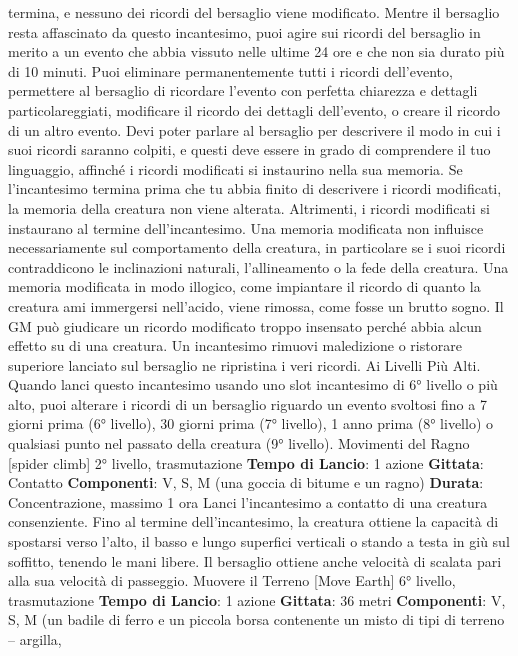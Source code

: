 \begin{multicols}{2}
termina, e nessuno dei ricordi del bersaglio viene
modificato.
Mentre il bersaglio resta affascinato da questo
incantesimo, puoi agire sui ricordi del bersaglio in
merito a un evento che abbia vissuto nelle ultime 24 ore
e che non sia durato più di 10 minuti. Puoi eliminare
permanentemente tutti i ricordi dell’evento, permettere
al bersaglio di ricordare l’evento con perfetta chiarezza
e dettagli particolareggiati, modificare il ricordo dei
dettagli dell’evento, o creare il ricordo di un altro evento.
Devi poter parlare al bersaglio per descrivere il modo in
cui i suoi ricordi saranno colpiti, e questi deve essere in
grado di comprendere il tuo linguaggio, affinché i ricordi
modificati si instaurino nella sua memoria. Se
l’incantesimo termina prima che tu abbia finito di
descrivere i ricordi modificati, la memoria della creatura
non viene alterata. Altrimenti, i ricordi modificati si
instaurano al termine dell’incantesimo.
Una memoria modificata non influisce necessariamente
sul comportamento della creatura, in particolare se i
suoi ricordi contraddicono le inclinazioni naturali,
l’allineamento o la fede della creatura. Una memoria
modificata in modo illogico, come impiantare il ricordo di
quanto la creatura ami immergersi nell’acido, viene
rimossa, come fosse un brutto sogno. Il GM può
giudicare un ricordo modificato troppo insensato perché
abbia alcun effetto su di una creatura.
Un incantesimo rimuovi maledizione o ristorare
superiore lanciato sul bersaglio ne ripristina i veri
ricordi.
Ai Livelli Più Alti. Quando lanci questo incantesimo
usando uno slot incantesimo di 6° livello o più alto, puoi
alterare i ricordi di un bersaglio riguardo un evento
svoltosi fino a 7 giorni prima (6° livello), 30 giorni prima
(7° livello), 1 anno prima (8° livello) o qualsiasi punto
nel passato della creatura (9° livello).
Movimenti del Ragno
[spider climb]
2° livello, trasmutazione
\textbf{Tempo di Lancio}: 1 azione
\textbf{Gittata}: Contatto
\textbf{Componenti}: V, S, M (una goccia di bitume e un
ragno)
\textbf{Durata}: Concentrazione, massimo 1 ora
Lanci l’incantesimo a contatto di una creatura
consenziente. Fino al termine dell’incantesimo, la
creatura ottiene la capacità di spostarsi verso l’alto, il
basso e lungo superfici verticali o stando a testa in giù
sul soffitto, tenendo le mani libere. Il bersaglio ottiene
anche velocità di scalata pari alla sua velocità di
passeggio.
Muovere il Terreno
[Move Earth]
6° livello, trasmutazione
\textbf{Tempo di Lancio}: 1 azione
\textbf{Gittata}: 36 metri
\textbf{Componenti}: V, S, M (un badile di ferro e un piccola
borsa contenente un misto di tipi di terreno – argilla,

\end{multicols}
